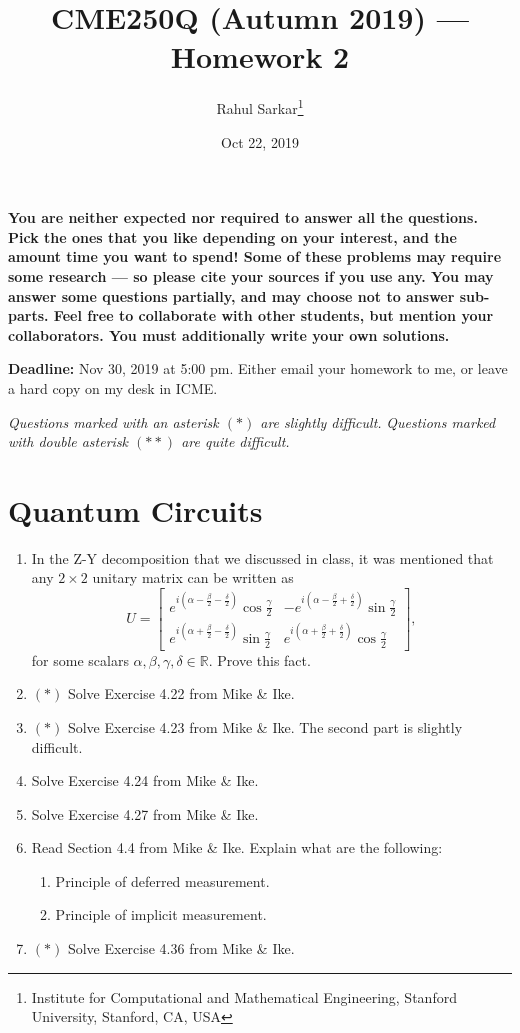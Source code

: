 \documentclass[10pt]{article}
\title{CME250Q (Autumn 2019) --- Homework 2}
\author{Rahul Sarkar\footnote{Institute for Computational and Mathematical Engineering, Stanford University, Stanford, CA, USA}}
\date{Oct 22, 2019}
\newcounter{ex}
\theoremstyle{plain}
\theoremstyle{definition}
\begin{document}
\maketitle

\textbf{You are neither expected nor required to answer all the questions. Pick the ones that you like depending on your interest, and the amount time you want to spend! Some of these problems may require some research --- so please cite your sources if you use any. You may answer some questions partially, and may choose not to answer sub-parts. Feel free to collaborate with other students, but mention your collaborators. You must additionally write your own solutions.}

\textbf{Deadline:} Nov 30, 2019 at 5:00 pm. Either email your homework to me, or leave a hard copy on my desk in ICME.

\textit{Questions marked with an asterisk $(\ast)$ are slightly difficult.}
\textit{Questions marked with double asterisk $(\ast \ast)$ are quite difficult.}

\section{Quantum Circuits}

\begin{enumerate}[label=(\roman*)]
\item In the Z-Y decomposition that we discussed in class, it was mentioned that any $2 \times 2$ unitary matrix can be written as
\begin{equation*}
U = 
\begin{bmatrix}
e^{i(\alpha - \frac{\beta}{2} - \frac{\delta}{2})} \cos{\frac{\gamma}{2}} & - e^{i(\alpha - \frac{\beta}{2} + \frac{\delta}{2})} \sin{\frac{\gamma}{2}} \\
e^{i(\alpha + \frac{\beta}{2} - \frac{\delta}{2})} \sin{\frac{\gamma}{2}} & e^{i(\alpha + \frac{\beta}{2} + \frac{\delta}{2})} \cos{\frac{\gamma}{2}}
\end{bmatrix},
\end{equation*}
for some scalars $\alpha, \beta, \gamma, \delta \in \mathbb{R}$. Prove this fact.

\item $(\ast)$ Solve Exercise 4.22 from Mike \& Ike.
\item $(\ast)$ Solve Exercise 4.23 from Mike \& Ike. The second part is slightly difficult.
\item Solve Exercise 4.24 from Mike \& Ike.
\item Solve Exercise 4.27 from Mike \& Ike.
\item Read Section 4.4 from Mike \& Ike. Explain what are the following:
	\begin{enumerate}[label=(\alph*)]
		\item Principle of deferred measurement.
		\item Principle of implicit measurement.
	\end{enumerate}
\item $(\ast)$ Solve Exercise 4.36 from Mike \& Ike.
\end{enumerate}
\end{document}
